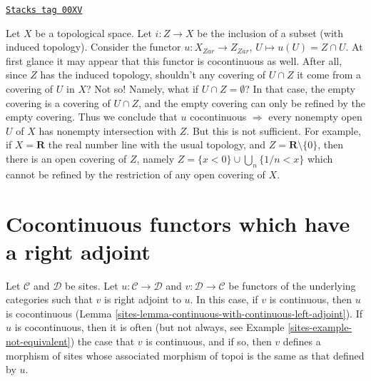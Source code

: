 \begin{example}
\label{sites-example-closed-map-cocontinuous-false}
\href{https://stacks.math.columbia.edu/tag/00XV}{\texttt{Stacks tag 00XV}}

Let $X$ be a topological space.
Let $i : Z  \to X$ be the inclusion of a subset (with induced
topology). Consider the functor $u : X_{Zar} \to Z_{Zar}$,
$U \mapsto u(U) = Z \cap U$.
At first glance it may appear that this functor is cocontinuous as
well. After all, since $Z$ has the induced topology,
shouldn't any covering of $U\cap Z$ it come from a covering
of $U$ in $X$? Not so! Namely, what if $U \cap Z = \emptyset$?
In that case, the empty covering is a covering of
$U \cap Z$, and the empty covering can only be refined by
the empty covering. Thus we conclude that
$u$ cocontinuous $\Rightarrow$ every nonempty open $U$
of $X$ has nonempty intersection with $Z$.
But this is not sufficient. For example, if
$X = \mathbf{R}$ the real number line with the usual
topology, and $Z = \mathbf{R} \setminus \{0\}$, then
there is an open covering of $Z$, namely
$Z = \{x < 0\} \cup \bigcup_n \{1/n < x\}$ which
cannot be refined by the restriction of any
open covering of $X$.
\end{example}

\section{Cocontinuous functors which have a right adjoint}
\label{sites-section-cocontinuous-adjoint}
Let $\mathcal{C}$ and $\mathcal{D}$ be sites. Let
$u : \mathcal{C} \to \mathcal{D}$ and $v : \mathcal{D} \to \mathcal{C}$
be functors of the underlying categories such that $v$ is right adjoint to $u$.
In this case, if $v$ is continuous, then $u$ is cocontinuous
(Lemma \ref{sites-lemma-continuous-with-continuous-left-adjoint}).
If $u$ is cocontinuous, then it is often
(but not always, see Example \ref{sites-example-not-equivalent})
the case that $v$ is continuous, and if so, then
$v$ defines a morphism of sites whose
associated morphism of topoi is the same as that defined by $u$.

